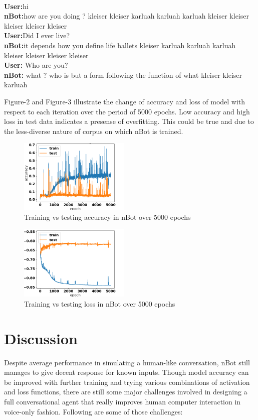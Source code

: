\documentclass[letterpaper] {article} %
\begin{document}
\\
	\begin{tcolorbox}
	\textbf{User:}hi \\
	\textbf{nBot:}how are you doing ? kleiser kleiser karluah karluah karluah kleiser kleiser kleiser kleiser kleiser \\
	\textbf{User:}Did I ever live?\\
	\textbf{nBot:}it depends how you define life ballets kleiser karluah karluah karluah kleiser kleiser kleiser kleiser\\
	\textbf{User:} Who are you?\\
	\textbf{nBot:} what ? who is but a form following the function of what kleiser kleiser karluah\\
	\end{tcolorbox}
Figure-2 and Figure-3 illustrate the change of accuracy and loss of model with respect to each iteration over the period of 5000 epochs. Low accuracy and high loss in test data indicates a presense of overfitting. This could be true and due to the less-diverse nature of corpus on which nBot is trained.

\begin{figure}[ht]
	\centering
	\includegraphics[width=200px]{figures/accuracy.png}
	\caption{Training vs testing accuracy in nBot over 5000 epochs}
	\label{fig:nbotaccuracy}
\end{figure}

\begin{figure}[ht]
	\centering
	\includegraphics[width=200px]{figures/loss.png}
	\caption{Training vs testing loss in nBot over 5000 epochs}
	\label{fig:nbotaccuracy}
\end{figure}
\section{Discussion}
Despite average performance in simulating a human-like conversation, nBot still manages to give decent response for known inputs. Though model accuracy can be improved with further training and trying various combinations of activation and loss functions, there are still some major challenges involved in designing a full conversational agent that really improves human computer interaction in voice-only fashion. Following are some of those challenges:
\end{document}
